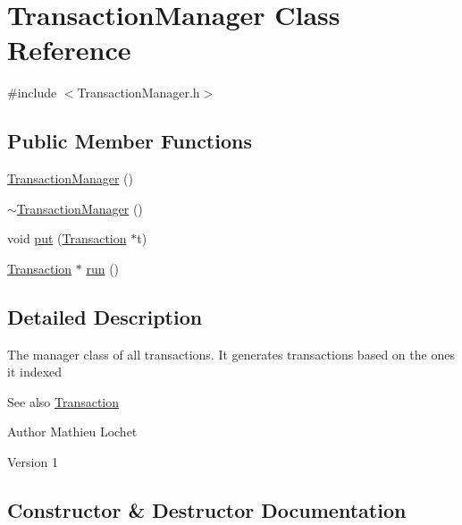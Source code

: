 \hypertarget{classTransactionManager}{}\section{Transaction\+Manager Class Reference}
\label{classTransactionManager}


{\ttfamily \#include $<$Transaction\+Manager.\+h$>$}

\subsection*{Public Member Functions}
\begin{DoxyCompactItemize}
\item 
\mbox{\hyperlink{classTransactionManager_ac5ced818a8f63f5981ab0e1e2dbf2e5c}{Transaction\+Manager}} ()
\item 
\mbox{\hyperlink{classTransactionManager_ab48dc6bf966c5c98e0734e1b1d819ef9}{$\sim$\+Transaction\+Manager}} ()
\item 
void \mbox{\hyperlink{classTransactionManager_a7956f511249bba3466ce3f3b57ee4518}{put}} (\mbox{\hyperlink{classTransaction}{Transaction}} $\ast$t)
\item 
\mbox{\hyperlink{classTransaction}{Transaction}} $\ast$ \mbox{\hyperlink{classTransactionManager_a27147afb36545b306a277697cd9a773d}{run}} ()
\end{DoxyCompactItemize}


\subsection{Detailed Description}
The manager class of all transactions. It generates transactions based on the ones it indexed \begin{DoxySeeAlso}{See also}
\mbox{\hyperlink{classTransaction}{Transaction}}
\end{DoxySeeAlso}
\begin{DoxyAuthor}{Author}
Mathieu Lochet 
\end{DoxyAuthor}
\begin{DoxyVersion}{Version}
1 
\end{DoxyVersion}


\subsection{Constructor \& Destructor Documentation}
\mbox{\label{classTransactionManager_ac5ced818a8f63f5981ab0e1e2dbf2e5c}} 
